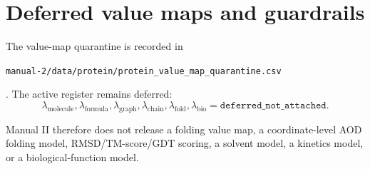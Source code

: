 \section{Deferred value maps and guardrails}

The value-map quarantine is recorded in
\begin{center}
\small\texttt{manual-2/data/protein/protein\_value\_map\_quarantine.csv}
\end{center}.
The active register remains deferred:
\[
\lambda_{\mathrm{molecule}},\lambda_{\mathrm{formula}},\lambda_{\mathrm{graph}},
\lambda_{\mathrm{chain}},\lambda_{\mathrm{fold}},\lambda_{\mathrm{bio}}
=\texttt{deferred\_not\_attached}.
\]

Manual II therefore does not release a folding value map, a coordinate-level AOD folding model, RMSD/TM-score/GDT scoring, a solvent model, a kinetics model, or a biological-function model.
